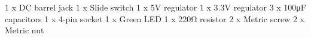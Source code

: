 1 x DC barrel jack
1 x Slide switch
1 x 5V regulator
1 x 3.3V regulator
3 x 100μF capacitors
1 x 4-pin socket
1 x Green LED
1 x 220Ω resistor
2 x Metric screw
2 x Metric nut
